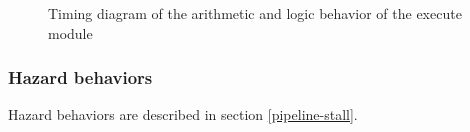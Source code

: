 \begin{figure}[H]
    \centering
    
    \caption{Timing diagram of the arithmetic and logic behavior of the execute module}
    \label{fig:exm-behavior-arithmetic-logic}
\end{figure}



\subsubsection{Hazard behaviors}

\begin{content}
  Hazard behaviors are described in section \ref{pipeline-stall}.
\end{content}

\newpage